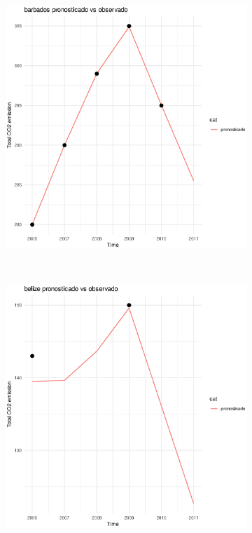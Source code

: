 \documentclass[twocolumn]{article}
\begin{document}
\begin{figure}
\begin{subfigure}{.3\textwidth}
        \end{subfigure}
        \hspace*{\fill}
        \begin{subfigure}{.3\textwidth}
            \includegraphics[width=\linewidth]{images/barbados_imputation.eps}
        \end{subfigure}\\
        \begin{subfigure}{.3\textwidth}
            \includegraphics[width=\linewidth]{images/belize_imputation.eps}

\end{subfigure}
\end{figure}
\end{document}
